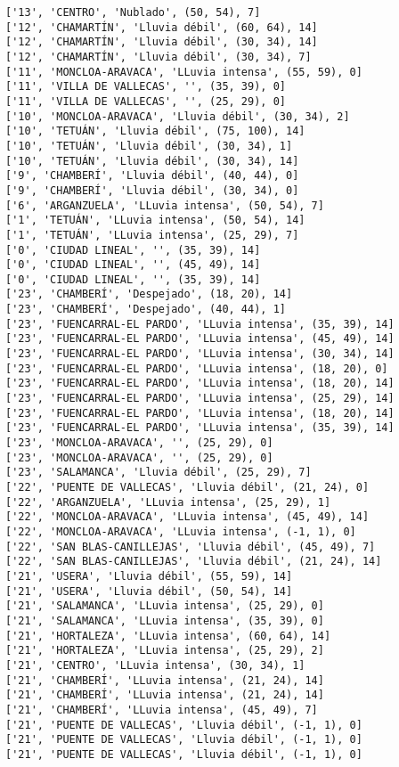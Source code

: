 \documentclass[11pt]{article}
\begin{document}
\begin{Verbatim}[commandchars=\\\{\}]
['13', 'CENTRO', 'Nublado', (50, 54), 7]
['12', 'CHAMARTÍN', 'Lluvia débil', (60, 64), 14]
['12', 'CHAMARTÍN', 'Lluvia débil', (30, 34), 14]
['12', 'CHAMARTÍN', 'Lluvia débil', (30, 34), 7]
['11', 'MONCLOA-ARAVACA', 'LLuvia intensa', (55, 59), 0]
['11', 'VILLA DE VALLECAS', '', (35, 39), 0]
['11', 'VILLA DE VALLECAS', '', (25, 29), 0]
['10', 'MONCLOA-ARAVACA', 'Lluvia débil', (30, 34), 2]
['10', 'TETUÁN', 'Lluvia débil', (75, 100), 14]
['10', 'TETUÁN', 'Lluvia débil', (30, 34), 1]
['10', 'TETUÁN', 'Lluvia débil', (30, 34), 14]
['9', 'CHAMBERÍ', 'Lluvia débil', (40, 44), 0]
['9', 'CHAMBERÍ', 'Lluvia débil', (30, 34), 0]
['6', 'ARGANZUELA', 'LLuvia intensa', (50, 54), 7]
['1', 'TETUÁN', 'LLuvia intensa', (50, 54), 14]
['1', 'TETUÁN', 'LLuvia intensa', (25, 29), 7]
['0', 'CIUDAD LINEAL', '', (35, 39), 14]
['0', 'CIUDAD LINEAL', '', (45, 49), 14]
['0', 'CIUDAD LINEAL', '', (35, 39), 14]
['23', 'CHAMBERÍ', 'Despejado', (18, 20), 14]
['23', 'CHAMBERÍ', 'Despejado', (40, 44), 1]
['23', 'FUENCARRAL-EL PARDO', 'LLuvia intensa', (35, 39), 14]
['23', 'FUENCARRAL-EL PARDO', 'LLuvia intensa', (45, 49), 14]
['23', 'FUENCARRAL-EL PARDO', 'LLuvia intensa', (30, 34), 14]
['23', 'FUENCARRAL-EL PARDO', 'LLuvia intensa', (18, 20), 0]
['23', 'FUENCARRAL-EL PARDO', 'LLuvia intensa', (18, 20), 14]
['23', 'FUENCARRAL-EL PARDO', 'LLuvia intensa', (25, 29), 14]
['23', 'FUENCARRAL-EL PARDO', 'LLuvia intensa', (18, 20), 14]
['23', 'FUENCARRAL-EL PARDO', 'LLuvia intensa', (35, 39), 14]
['23', 'MONCLOA-ARAVACA', '', (25, 29), 0]
['23', 'MONCLOA-ARAVACA', '', (25, 29), 0]
['23', 'SALAMANCA', 'Lluvia débil', (25, 29), 7]
['22', 'PUENTE DE VALLECAS', 'Lluvia débil', (21, 24), 0]
['22', 'ARGANZUELA', 'LLuvia intensa', (25, 29), 1]
['22', 'MONCLOA-ARAVACA', 'LLuvia intensa', (45, 49), 14]
['22', 'MONCLOA-ARAVACA', 'LLuvia intensa', (-1, 1), 0]
['22', 'SAN BLAS-CANILLEJAS', 'Lluvia débil', (45, 49), 7]
['22', 'SAN BLAS-CANILLEJAS', 'Lluvia débil', (21, 24), 14]
['21', 'USERA', 'Lluvia débil', (55, 59), 14]
['21', 'USERA', 'Lluvia débil', (50, 54), 14]
['21', 'SALAMANCA', 'LLuvia intensa', (25, 29), 0]
['21', 'SALAMANCA', 'LLuvia intensa', (35, 39), 0]
['21', 'HORTALEZA', 'LLuvia intensa', (60, 64), 14]
['21', 'HORTALEZA', 'LLuvia intensa', (25, 29), 2]
['21', 'CENTRO', 'LLuvia intensa', (30, 34), 1]
['21', 'CHAMBERÍ', 'LLuvia intensa', (21, 24), 14]
['21', 'CHAMBERÍ', 'LLuvia intensa', (21, 24), 14]
['21', 'CHAMBERÍ', 'LLuvia intensa', (45, 49), 7]
['21', 'PUENTE DE VALLECAS', 'Lluvia débil', (-1, 1), 0]
['21', 'PUENTE DE VALLECAS', 'Lluvia débil', (-1, 1), 0]
['21', 'PUENTE DE VALLECAS', 'Lluvia débil', (-1, 1), 0]

\end{Verbatim}
\end{document}
